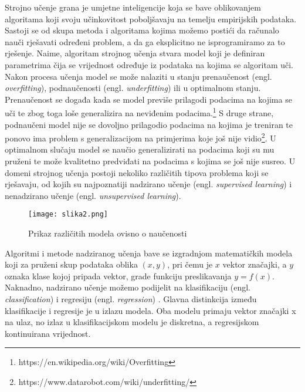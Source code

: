 \documentclass[times, utf8, zavrsni]{fer}
\begin{document}
Strojno učenje grana je umjetne inteligencije koja se bave oblikovanjem algoritama koji svoju učinkovitost poboljšavaju na temelju empirijskih podataka. Sastoji se od skupa metoda i algoritama kojima možemo postići da računalo nauči rješavati određeni problem, a da ga eksplicitno ne isprogramiramo za to rješenje. Naime, algoritam strojnog učenja stvara model koji je definiran parametrima čija se vrijednost određuje iz podataka na kojima se algoritam uči. Nakon procesa učenja model se može nalaziti u stanju prenaučenost (engl. \textit{overfitting}), podnaučenosti (engl. \textit{underfitting}) ili u optimalnom stanju. Prenaučenost se događa kada se model previše prilagodi podacima na kojima se uči te zbog toga loše generalizira na neviđenim podacima.\footnote{https://en.wikipedia.org/wiki/Overfitting} S druge strane, podnaučeni model nije se dovoljno prilagodio podacima na kojima je treniran te ponovo ima problem s generalizacijom na primjerima koje još nije vidio\footnote{https://www.datarobot.com/wiki/underfitting/}. U optimalnom slučaju model se naučio generalizirati na podacima koji su mu pruženi te može kvalitetno predviđati na podacima s kojima se još nije susreo. U domeni strojnog učenja postoji nekoliko različitih tipova problema koji se rješavaju, od kojih su najpoznatiji nadzirano učenje (engl. \textit{supervised learning}) i nenadzirano učenje (engl. \textit{unsupervised learning}).\newline


\begin{figure}[h]
	\centering
	\texttt{[image: slika2.png]}
	\caption{Prikaz različitih modela ovisno o naučenosti \protect \footnotemark}
\end{figure}





Algoritmi i metode nadziranog učenja bave se izgradnjom matematičkih modela koji za pruženi skup podataka oblika $(x,y)$, pri čemu je $x$ vektor značajki, a $y$ oznaka klase kojoj pripada vektor, grade funkciju  preslikavanja $y = f(x)$. Naknadno, nadzirano učenje možemo podijelit na klasifikaciju (engl. \textit{classification}) i regresiju (engl. \textit{regression}) \citep{love2002}.
Glavna distinkcija između klasifikacije i regresije je u izlazu modela. Oba modelu primaju vektor značajki x na ulaz, no izlaz u klasifikacijskom modelu je diskretna, a regresijskom kontinuirana vrijednost.
\end{document}
